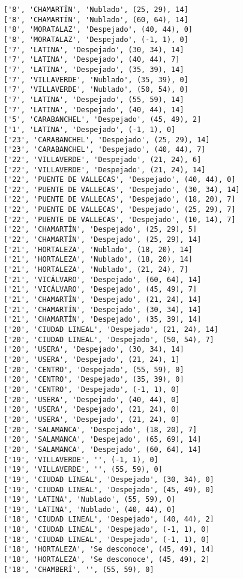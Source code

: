 \documentclass[11pt]{article}
\begin{document}
\begin{Verbatim}[commandchars=\\\{\}]
['8', 'CHAMARTÍN', 'Nublado', (25, 29), 14]
['8', 'CHAMARTÍN', 'Nublado', (60, 64), 14]
['8', 'MORATALAZ', 'Despejado', (40, 44), 0]
['8', 'MORATALAZ', 'Despejado', (-1, 1), 0]
['7', 'LATINA', 'Despejado', (30, 34), 14]
['7', 'LATINA', 'Despejado', (40, 44), 7]
['7', 'LATINA', 'Despejado', (35, 39), 14]
['7', 'VILLAVERDE', 'Nublado', (35, 39), 0]
['7', 'VILLAVERDE', 'Nublado', (50, 54), 0]
['7', 'LATINA', 'Despejado', (55, 59), 14]
['7', 'LATINA', 'Despejado', (40, 44), 14]
['5', 'CARABANCHEL', 'Despejado', (45, 49), 2]
['1', 'LATINA', 'Despejado', (-1, 1), 0]
['23', 'CARABANCHEL', 'Despejado', (25, 29), 14]
['23', 'CARABANCHEL', 'Despejado', (40, 44), 7]
['22', 'VILLAVERDE', 'Despejado', (21, 24), 6]
['22', 'VILLAVERDE', 'Despejado', (21, 24), 14]
['22', 'PUENTE DE VALLECAS', 'Despejado', (40, 44), 0]
['22', 'PUENTE DE VALLECAS', 'Despejado', (30, 34), 14]
['22', 'PUENTE DE VALLECAS', 'Despejado', (18, 20), 7]
['22', 'PUENTE DE VALLECAS', 'Despejado', (25, 29), 7]
['22', 'PUENTE DE VALLECAS', 'Despejado', (10, 14), 7]
['22', 'CHAMARTÍN', 'Despejado', (25, 29), 5]
['22', 'CHAMARTÍN', 'Despejado', (25, 29), 14]
['21', 'HORTALEZA', 'Nublado', (18, 20), 14]
['21', 'HORTALEZA', 'Nublado', (18, 20), 14]
['21', 'HORTALEZA', 'Nublado', (21, 24), 7]
['21', 'VICÁLVARO', 'Despejado', (60, 64), 14]
['21', 'VICÁLVARO', 'Despejado', (45, 49), 7]
['21', 'CHAMARTÍN', 'Despejado', (21, 24), 14]
['21', 'CHAMARTÍN', 'Despejado', (30, 34), 14]
['21', 'CHAMARTÍN', 'Despejado', (35, 39), 14]
['20', 'CIUDAD LINEAL', 'Despejado', (21, 24), 14]
['20', 'CIUDAD LINEAL', 'Despejado', (50, 54), 7]
['20', 'USERA', 'Despejado', (30, 34), 14]
['20', 'USERA', 'Despejado', (21, 24), 1]
['20', 'CENTRO', 'Despejado', (55, 59), 0]
['20', 'CENTRO', 'Despejado', (35, 39), 0]
['20', 'CENTRO', 'Despejado', (-1, 1), 0]
['20', 'USERA', 'Despejado', (40, 44), 0]
['20', 'USERA', 'Despejado', (21, 24), 0]
['20', 'USERA', 'Despejado', (21, 24), 0]
['20', 'SALAMANCA', 'Despejado', (18, 20), 7]
['20', 'SALAMANCA', 'Despejado', (65, 69), 14]
['20', 'SALAMANCA', 'Despejado', (60, 64), 14]
['19', 'VILLAVERDE', '', (-1, 1), 0]
['19', 'VILLAVERDE', '', (55, 59), 0]
['19', 'CIUDAD LINEAL', 'Despejado', (30, 34), 0]
['19', 'CIUDAD LINEAL', 'Despejado', (45, 49), 0]
['19', 'LATINA', 'Nublado', (55, 59), 0]
['19', 'LATINA', 'Nublado', (40, 44), 0]
['18', 'CIUDAD LINEAL', 'Despejado', (40, 44), 2]
['18', 'CIUDAD LINEAL', 'Despejado', (-1, 1), 0]
['18', 'CIUDAD LINEAL', 'Despejado', (-1, 1), 0]
['18', 'HORTALEZA', 'Se desconoce', (45, 49), 14]
['18', 'HORTALEZA', 'Se desconoce', (45, 49), 2]
['18', 'CHAMBERÍ', '', (55, 59), 0]

\end{Verbatim}
\end{document}
